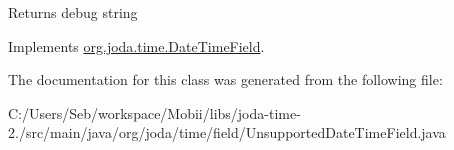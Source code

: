 \begin{DoxyReturn}{Returns}
debug string 
\end{DoxyReturn}


Implements \hyperlink{classorg_1_1joda_1_1time_1_1_date_time_field_a9d888721d7214b6953f3bb3cc4fa5583}{org.\-joda.\-time.\-Date\-Time\-Field}.



The documentation for this class was generated from the following file\-:\begin{DoxyCompactItemize}
\item 
C\-:/\-Users/\-Seb/workspace/\-Mobii/libs/joda-\/time-\/2./src/main/java/org/joda/time/field/Unsupported\-Date\-Time\-Field.\-java\end{DoxyCompactItemize}
